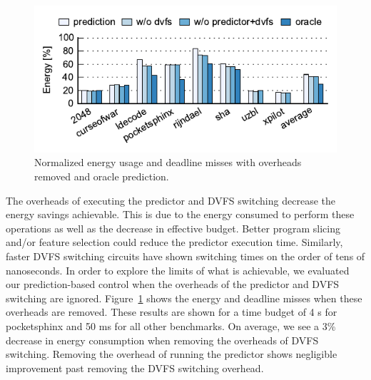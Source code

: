 \begin{figure}
  \begin{center}
    \includegraphics{exec_time_prediction/data/overhead_comparison.pdf}
    \caption{Normalized energy usage and deadline misses with overheads removed
    and oracle prediction. }
    \label{fig:evaluation.overhead_comparison}
  \end{center}
\end{figure}

The overheads of executing the predictor and DVFS switching decrease the energy
savings achievable. This is due to the energy consumed to perform these
operations as well as the decrease in effective budget.
Better program slicing and/or feature selection could reduce the predictor execution time.
Similarly, faster DVFS switching circuits \cite{booster-hpca12,
shortstop-vlsic13, fgsync-micro14} have shown switching times on the order of
tens of nanoseconds. In order to explore the limits of what is achievable, we
evaluated our prediction-based control when the overheads of the predictor and
DVFS switching are ignored.
Figure~\ref{fig:evaluation.overhead_comparison} shows the energy and deadline
misses when these overheads are removed. These results are shown for a time
budget of 4 s for pocketsphinx and 50 ms for all other benchmarks.
On average,
we see a 3\% decrease in
energy consumption when removing the overheads of DVFS switching. Removing the
overhead of running the predictor shows negligible improvement past
removing the DVFS switching overhead.

